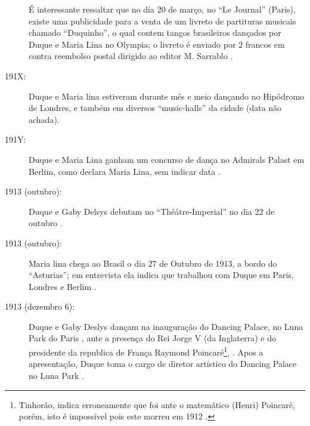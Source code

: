 \begin{description}
É interessante ressaltar que no dia 20 de março, no ``Le Journal'' (Paris), existe uma publicidade 
para a venta de um livreto de partituras musicais chamado ``Duquinho'', %
o qual contem tangos brasileiros dançados por Duque e Maria Lina no Olympia;
o livreto é enviado por 2 francos em contra reembolso postal dirigido ao editor M. Sarrablo \cite[pp. 7]{maxixe1913reidotango:2}.

\item[191X:] Duque e Maria lina estiveram durante mês e meio dançando no Hipódromo de Londres,
e também em diversos ``music-halls'' da cidade
\cite[pp. 3]{maxixe1913marialina} \cite[pp. 83]{tinhorao1986pequena} \cite[pp. 1]{maxixeparis1915:0} (data não achada).

\item[191Y:] Duque e Maria Lina  ganham um concurso de dança no Admirals Palast em Berlim,
como declara Maria Lina, sem indicar data \cite[pp. 3]{maxixe1913marialina} \cite[pp. 83]{tinhorao1986pequena}.

\item[1913 (outubro):] Duque e Gaby Delsys debutam no ``Théâtre-Imperial''
no dia 22 de outubro \cite[pp. 5]{maxixe1913duquegaby:3}.

\item[1913 (outubro):] Maria lina chega ao Brasil o dia 27 de Outubro de 1913,
a bordo do ``Asturias''; 
em entrevista ela indica que trabalhou com Duque em Paris, Londres e Berlim 
\cite[pp. 8]{maxixe1913marialina:0}\cite[pp. 3]{maxixe1913marialina}.


 



\item[1913 (dezembro 6):] Duque e Gaby Deslys dançam na
inauguração do Dancing Palace, no Luna Park do Paris 
\cite[pp. 14]{maxixeparis1914} \cite{maxixe1913dancingpalace:1}, 
ante a presença do Rei Jorge V (da Inglaterra) e 
do presidente da republica de França  Raymond Poincaré\footnote{Tinhorão,
indica erroneamente que foi ante o matemático (Henri) Poincaré,
porém, isto é impossível pois este morreu em 1912  \cite[pp. 84]{tinhorao1986pequena}.}, 
\cite[pp. 73]{shaw2018tropical}.
Apos a apresentação, Duque toma o cargo de diretor artístico do Dancing Palace no Luna Park \cite[pp. 4]{maxixe1913dancingpalace:2}.


\end{description}
